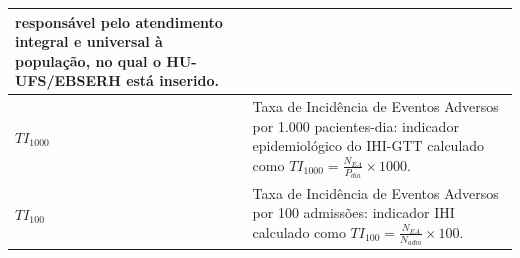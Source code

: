 \begin{anexosenv}
\begin{quadro}[htb]
\begin{tabularx}{\textwidth}{l X}
  responsável pelo atendimento integral e universal à população, no qual
  o HU-UFS/EBSERH está inserido. \\
\midrule
\textbf{$TI_{1000}$} & Taxa de Incidência de Eventos Adversos por 1.000
  pacientes-dia: indicador epidemiológico do IHI-GTT calculado como
  $TI_{1000} = \frac{N_{EA}}{P_{dia}} \times 1000$. \\
\midrule
\textbf{$TI_{100}$} & Taxa de Incidência de Eventos Adversos por 100
  admissões: indicador IHI calculado como
  $TI_{100} = \frac{N_{EA}}{N_{adm}} \times 100$. \\
\bottomrule
\end{tabularx}
\end{quadro}

\end{anexosenv}

